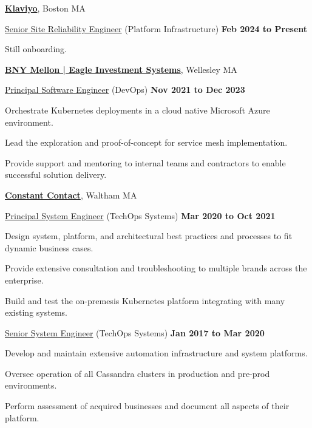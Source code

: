 \documentclass[10pt]{article}
\renewcommand\textit[1]{\underline{#1}}
\newcommand{\halfblankline}{\quad\vspace{-0.5\baselineskip}\pagebreak[3]}
\begin{document}
\href{https://www.klaviyo.com/}{\textbf{Klaviyo}},
Boston MA
\begin{outerlist}
	\item[] \textit{Senior Site Reliability Engineer} (Platform Infrastructure)
        \hfill \textbf{Feb 2024 to Present}
	\begin{innerlist}
		\item Still onboarding.
        \end{innerlist}
\end{outerlist}
\halfblankline

\href{https://www.bnymellon.com/us/en/solutions/asset-managers/data-analytics.html}{\textbf{BNY Mellon | Eagle Investment Systems}},
Wellesley MA
\begin{outerlist}
	\item[] \textit{Principal Software Engineer} (DevOps)
        \hfill \textbf{Nov 2021 to Dec 2023}
	\begin{innerlist}
		\item Orchestrate Kubernetes deployments in a cloud native Microsoft Azure environment.
		\item Lead the exploration and proof-of-concept for service mesh implementation.
		\item Provide support and mentoring to internal teams and contractors to enable successful solution delivery.
        \end{innerlist}
\end{outerlist}
\halfblankline

\href{https://www.constantcontact.com/}{\textbf{Constant Contact}},
Waltham MA
\begin{outerlist}
	\item[] \textit{Principal System Engineer} (TechOps Systems)
        \hfill \textbf{Mar 2020 to Oct 2021}
	\begin{innerlist}
		\item Design system, platform, and architectural best practices and processes to fit dynamic business cases.
		\item Provide extensive consultation and troubleshooting to multiple brands across the enterprise.
		\item Build and test the on-premesis Kubernetes platform integrating with many existing systems.
        \end{innerlist}

	\item[] \textit{Senior System Engineer} (TechOps Systems)
        \hfill \textbf{Jan 2017 to Mar 2020}
	\begin{innerlist}
		\item Develop and maintain extensive automation infrastructure and system platforms.
		\item Oversee operation of all Cassandra clusters in production and pre-prod environments.
		\item Perform assessment of acquired businesses and document all aspects of their platform.
        \end{innerlist}
\end{outerlist}
\halfblankline
\end{document}

